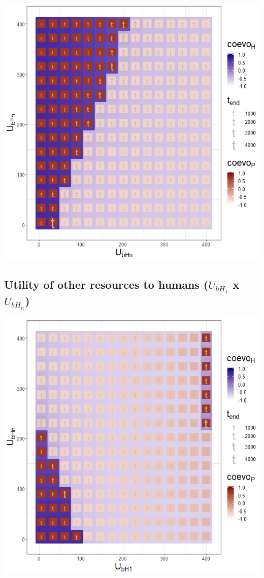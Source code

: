 \documentclass[]{book}
\begin{document}

\includegraphics[width=1\linewidth]{plots/3_twoPar-U.bHn-U.bPn_plot}

\newpage

\hypertarget{utility-of-other-resources-to-humans-u_bh_1-x-u_bh_n}{%
\subsection{\texorpdfstring{Utility of other resources to humans (\(U_{bH_{1}}\) x \(U_{bH_{n}}\))}{Utility of other resources to humans (U\_\{bH\_\{1\}\} x U\_\{bH\_\{n\}\})}}\label{utility-of-other-resources-to-humans-u_bh_1-x-u_bh_n}}


\includegraphics[width=1\linewidth]{plots/3_twoPar-U.bH1-U.bHn_plot}
\end{document}
